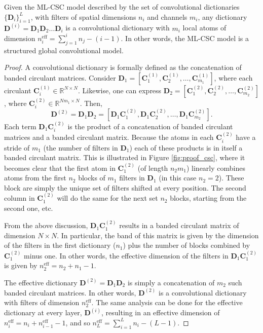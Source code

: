 \documentclass[10pt,journal]{IEEEtran}
\def\D{{\mathbf D}}
\def\C{{\mathbf C}}
\theoremstyle{plain}
\theoremstyle{definition}
\begin{document}
\begin{customlemma}{1} \label{lemma:MLCSCisCSC}
	Given the ML-CSC model described by the set of convolutional dictionaries $\{\D_i\}_{i=1}^L$, with filters of spatial dimensions $n_i$ and channels $m_i$, any dictionary $\D^{(i)} = \D_1 \D_2 \dots \D_i$ is a convolutional dictionary with $m_i$ local atoms of dimension $n_i^{\text{eff}} = \sum_{j=1}^{i} n_j - (i-1)$. In other words, the ML-CSC model is a structured global convolutional model.
\end{customlemma}
\begin{proof} 
	A convolutional dictionary is formally defined as the concatenation of banded circulant matrices. Consider $\D_1 = \left[ \C^{(1)}_1, \C^{(1)}_2, \dots, \C^{(1)}_{m_1}\right]$, where each circulant $\C^{(1)}_i \in \mathbb{R}^{N\times N}$. Likewise, one can express $\D_2 = \left[ \C^{(2)}_1, \C^{(2)}_2, \dots, \C^{(2)}_{m_2}\right]$, where $\C^{(2)}_i \in \mathbb{R}^{Nm_1\times N}$. Then,
	\begin{equation}
	\D^{(2)} = \D_1\D_2 = \left[ \D_1 \C^{(2)}_1, \D_1\C^{(2)}_2, \dots, \D_1\C^{(2)}_{m_2}\right].
	\end{equation}
	Each term $\D_1\C^{(2)}_i$ is the product of a concatenation of banded circulant matrices and a banded circulant matrix. Because the atoms in each $\C^{(2)}_i$ have a stride of $m_1$ (the number of filters in $\D_1$) each of these products is in itself a banded circulant matrix. This is illustrated in Figure \ref{fig:proof_csc}, where it becomes clear that the first atom in $\C^{(2)}_1$ (of length $n_2m_1$) linearly combines atoms from the first $n_2$ blocks of $m_1$ filters in $\D_1$ (in this case $n_2 = 2$). These block are simply the unique set of filters shifted at every position. The second column in $\C^{(2)}_1$ will do the same for the next set $n_2$ blocks, starting from the second one, etc. 
	
	From the above discussion, $\D_1\C^{(2)}_1$ results in a banded circulant matrix of dimension $N\times N$. In particular, the band of this matrix is given by the dimension of the filters in the first dictionary ($n_1$) plus the number of blocks combined by $\C^{(2)}_1$ minus one. In other words, the effective dimension of the filters in $\D_1\C^{(2)}_1$ is given by $n^\text{eff}_2 = n_2+n_1-1$.
	
	The effective dictionary $\D^{(2)} = \D_1\D_2$ is simply a concatenation of $m_2$ such banded circulant matrices. In other words, $\D^{(2)}$ is a convolutional dictionary with filters of dimension $n_2^\text{eff}$. The same analysis can be done for the effective dictionary at every layer, $\D^{(i)}$, resulting in an effective dimension of $n^{\text{eff}}_i = n_i + n^{\text{eff}}_{i-1}-1$, and so $n_L^{\text{eff}} = \sum_{i=1}^{L} n_i - (L-1)$. 
	

\end{proof}
\end{document}
